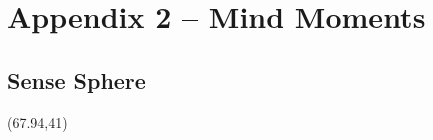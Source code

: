 
\section{Appendix 2 -- Mind Moments}

%
%
\pagestyle{empty}

\makeatletter
{}
\makeatother

\graphicspath{{../}}

\subsection*{Sense Sphere}

\setlength{\tabcolsep}{0pt}
\renewcommand{\arraystretch}{1.1}
\setlength{\TPHorizModule}{1mm}
\setlength{\TPVertModule}{1mm}

\begin{textblock}{1}(67.94,41)

\end{textblock}

